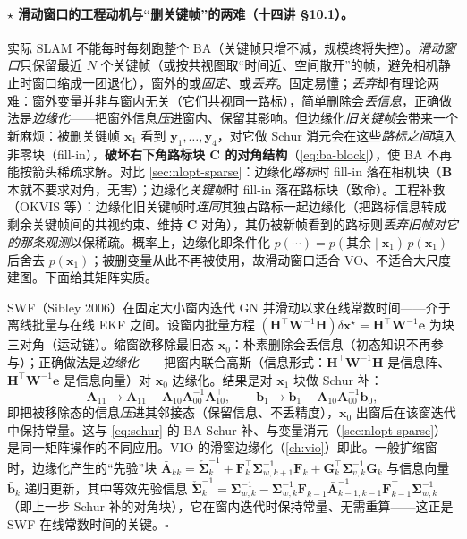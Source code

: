 \paragraph{$\star$ 滑动窗口的工程动机与“删关键帧”的两难（十四讲 §10.1）。}\cite{gaoxiang2019slam14}
实际 SLAM 不能每时每刻跑整个 BA（关键帧只增不减，规模终将失控）。\emph{滑动窗口}只保留最近 $N$ 个关键帧（或按共视图取“时间近、空间散开”的帧，避免相机静止时窗口缩成一团退化），窗外的或\emph{固定}、或\emph{丢弃}。固定易懂；\emph{丢弃}却有理论两难：窗外变量并非与窗内无关（它们共视同一路标），简单删除会\emph{丢信息}，正确做法是\emph{边缘化}——把窗外信息\emph{压}进窗内、保留其影响。但边缘化\emph{旧关键帧}会带来一个新麻烦：被删关键帧 $\mathbf{x}_1$ 看到 $\mathbf{y}_1,\dots,\mathbf{y}_4$，对它做 Schur 消元会在这些\emph{路标之间}填入非零块（fill-in），\textbf{破坏右下角路标块 $\mathbf{C}$ 的对角结构}（\cref{eq:ba-block}），使 BA 不再能按箭头稀疏求解。对比 \cref{sec:nlopt-sparse}：边缘化\emph{路标}时 fill-in 落在相机块（$\mathbf{B}$ 本就不要求对角，无害）；边缘化\emph{关键帧}时 fill-in 落在路标块（致命）。工程补救（OKVIS\cite{leutenegger2015okvis} 等）：边缘化旧关键帧时\emph{连同}其独占路标一起边缘化（把路标信息转成剩余关键帧间的共视约束、维持 $\mathbf{C}$ 对角），其仍被新帧看到的路标则\emph{丢弃旧帧对它的那条观测}以保稀疏。概率上，边缘化即条件化 $p(\cdots)=p(\text{其余}\mid\mathbf{x}_1)\,p(\mathbf{x}_1)$ 后舍去 $p(\mathbf{x}_1)$；被删变量从此不再被使用，故滑动窗口适合 VO、不适合大尺度建图。下面给其矩阵实质。

\begin{derivation}[$\star$ 滑动窗口滤波：边缘化 $=$ Schur 补]
SWF（Sibley 2006）在固定大小窗内迭代 GN 并滑动以求在线常数时间——介于离线批量与在线 EKF 之间。设窗内批量方程 $(\mathbf{H}^\top\mathbf{W}^{-1}\mathbf{H})\delta\mathbf{x}^\star=\mathbf{H}^\top\mathbf{W}^{-1}\mathbf{e}$ 为块三对角（运动链）。缩窗欲移除最旧态 $\mathbf{x}_0$：朴素删除会丢信息（初态知识不再参与）；正确做法是\emph{边缘化}——把窗内联合高斯（信息形式：$\mathbf{H}^\top\mathbf{W}^{-1}\mathbf{H}$ 是信息阵、$\mathbf{H}^\top\mathbf{W}^{-1}\mathbf{e}$ 是信息向量）对 $\mathbf{x}_0$ 边缘化。结果是对 $\mathbf{x}_1$ 块做 Schur 补：
\[
  \mathbf{A}_{11}\to\mathbf{A}_{11}-\mathbf{A}_{10}\mathbf{A}_{00}^{-1}\mathbf{A}_{10}^\top,\qquad
  \mathbf{b}_1\to\mathbf{b}_1-\mathbf{A}_{10}\mathbf{A}_{00}^{-1}\mathbf{b}_0,
\]
即把被移除态的信息\emph{压}进其邻接态（保留信息、不丢精度），$\mathbf{x}_0$ 出窗后在该窗迭代中保持常量。这与 \cref{eq:schur} 的 BA Schur 补、与变量消元（\cref{sec:nlopt-sparse}）是同一矩阵操作的不同应用。VIO 的滑窗边缘化（\cref{ch:vio}）即此。一般扩缩窗时，边缘化产生的“先验”块 $\bar{\mathbf{A}}_{kk}=\check{\boldsymbol{\Sigma}}_k^{-1}+\mathbf{F}_k^\top\boldsymbol{\Sigma}_{w,k+1}^{-1}\mathbf{F}_k+\mathbf{G}_k^\top\boldsymbol{\Sigma}_{v,k}^{-1}\mathbf{G}_k$ 与信息向量 $\bar{\mathbf{b}}_k$ 递归更新，其中等效先验信息 $\check{\boldsymbol{\Sigma}}_k^{-1}=\boldsymbol{\Sigma}_{w,k}^{-1}-\boldsymbol{\Sigma}_{w,k}^{-1}\mathbf{F}_{k-1}\bar{\mathbf{A}}_{k-1,k-1}^{-1}\mathbf{F}_{k-1}^\top\boldsymbol{\Sigma}_{w,k}^{-1}$（即上一步 Schur 补的对角块），它在窗内迭代时保持常量、无需重算——这正是 SWF 在线常数时间的关键\cite{barfoot2024state}。\hfill$\square$
\end{derivation}

